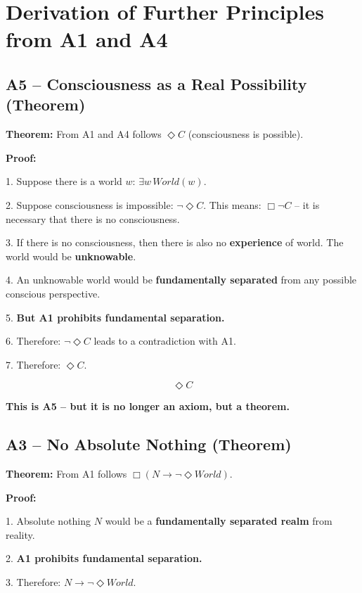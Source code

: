 \documentclass[
]{article}
\begin{document}
\section{Derivation of Further Principles from A1 and A4}\label{derivation-of-further-principles-from-a1-and-a4}

\subsection{A5 – Consciousness as a Real Possibility (Theorem)}\label{a5-consciousness-as-a-real-possibility-theorem}

\textbf{Theorem:} From A1 and A4 follows \(\Diamond C\) (consciousness is possible).

\textbf{Proof:}

1. Suppose there is a world \(w\): \(\exists w\, World(w)\).

2. Suppose consciousness is impossible: \(\neg\Diamond C\). This means: \(\Box\neg C\) – it is necessary that there is no consciousness.

3. If there is no consciousness, then there is also no \textbf{experience} of world. The world would be \textbf{unknowable}.

4. An unknowable world would be \textbf{fundamentally separated} from any possible conscious perspective.

5. \textbf{But A1 prohibits fundamental separation.}

6. Therefore: \(\neg\Diamond C\) leads to a contradiction with A1.

7. Therefore: \(\Diamond C\).

\[
\boxed{\Diamond C}
\]

\textbf{This is A5 – but it is no longer an axiom, but a theorem.}

\subsection{A3 – No Absolute Nothing (Theorem)}\label{a3-no-absolute-nothing-theorem}

\textbf{Theorem:} From A1 follows \(\Box(N \rightarrow \neg\Diamond World)\).

\textbf{Proof:}

1. Absolute nothing \(N\) would be a \textbf{fundamentally separated realm} from reality.

2. \textbf{A1 prohibits fundamental separation.}

3. Therefore: \(N \rightarrow \neg\Diamond World\).
\end{document}
